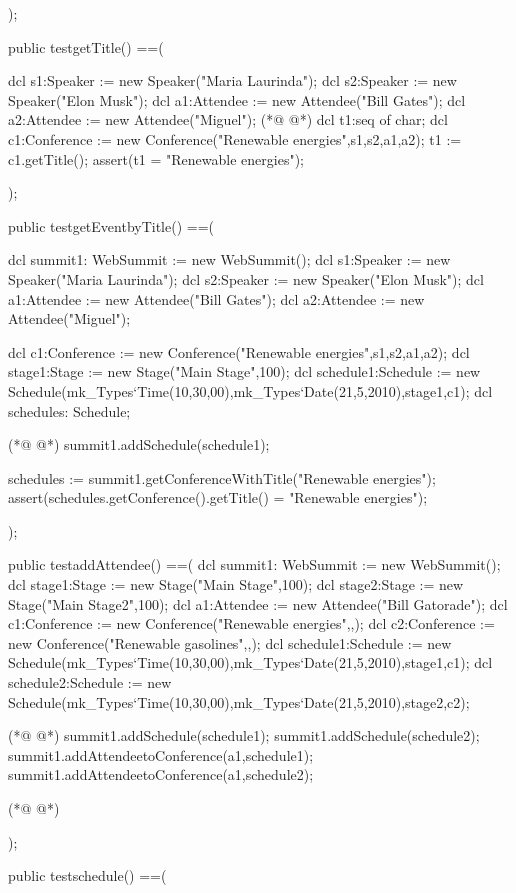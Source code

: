 \begin{vdmpp}[breaklines=true]
 
 );
 
  public testgetTitle() ==( 
  
  dcl s1:Speaker := new Speaker("Maria Laurinda");
  dcl s2:Speaker := new Speaker("Elon Musk");
  dcl a1:Attendee := new Attendee("Bill Gates");
  dcl a2:Attendee := new Attendee("Miguel");
(*@
\label{testgetEventbyTitle:145}
@*)
  dcl t1:seq of char;
  dcl c1:Conference := new Conference("Renewable energies",{s1,s2},{a1,a2});
  t1 := c1.getTitle();
  assert(t1 = "Renewable energies");
 
 
 );
 
 public testgetEventbyTitle() ==(
 
 dcl summit1: WebSummit := new WebSummit();
  dcl s1:Speaker := new Speaker("Maria Laurinda");
  dcl s2:Speaker := new Speaker("Elon Musk");
  dcl a1:Attendee := new Attendee("Bill Gates");
  dcl a2:Attendee := new Attendee("Miguel");
  
  dcl c1:Conference := new Conference("Renewable energies",{s1,s2},{a1,a2});
  dcl stage1:Stage := new Stage("Main Stage",100);
  dcl schedule1:Schedule := new Schedule(mk_Types`Time(10,30,00),mk_Types`Date(21,5,2010),stage1,c1);
  dcl schedules: Schedule;
  
(*@
\label{testaddAttendee:166}
@*)
  summit1.addSchedule(schedule1);
  
  schedules := summit1.getConferenceWithTitle("Renewable energies");
  assert(schedules.getConference().getTitle() = "Renewable energies");
 
 
 );
 
 public testaddAttendee() ==(
 dcl summit1: WebSummit := new WebSummit();
   dcl stage1:Stage := new Stage("Main Stage",100);
   dcl stage2:Stage := new Stage("Main Stage2",100);
   dcl a1:Attendee := new Attendee("Bill Gatorade");
   dcl c1:Conference := new Conference("Renewable energies",{},{});
   dcl c2:Conference := new Conference("Renewable gasolines",{},{});   
   dcl schedule1:Schedule := new Schedule(mk_Types`Time(10,30,00),mk_Types`Date(21,5,2010),stage1,c1);
   dcl schedule2:Schedule := new Schedule(mk_Types`Time(10,30,00),mk_Types`Date(21,5,2010),stage2,c2);
  
(*@
\label{testaddShowroom:184}
@*)
  summit1.addSchedule(schedule1);
  summit1.addSchedule(schedule2);  
  summit1.addAttendeetoConference(a1,schedule1);
  summit1.addAttendeetoConference(a1,schedule2);

   
(*@
\label{testschedule:190}
@*)
 
 );
 
 public testschedule() ==(
 

\end{vdmpp}
